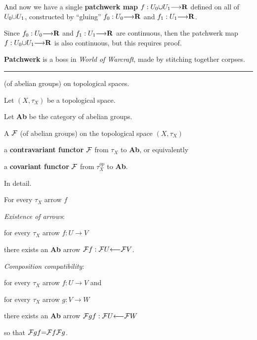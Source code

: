 \vs
And now we have a single {\bf patchwerk map} $f: \g{U_0} \p\cup \b{U_1} \to \R$ defined on all of $\g{U_0} \p\cup \b{U_1}$, constructed by ``gluing'' $\g{f_0}: \g{U_0} \to \R$ and $\b{f_1}: \b{U_1} \to \R$. \par
Since $\g{f_0}: \g{U_0} \to \R$ and $\b{f_1}: \b{U_1} \to \R$ are continuous, then the patchwerk map $f: \g{U_0} \p\cup \b{U_1} \to \R$ is also continuous, but this requires proof. \par
{\bf Patchwerk} is a boss in {\it World of Warcraft}, made by stitching together corpses.

\vs\hrule\vskip1pt
 (of abelian groups) on topological spaces. \par
Let $(X, \tau_X)$ be a topological space. \par
Let {\bf Ab} be the category of abelian groups. \par
A  ${\cal F}$ (of abelian groups) on the topological space $(X, \tau_X)$  \par
  \hs a {\bf contravariant functor} ${\cal F}$ from $\tau_X$ to {\bf Ab}, or equivalently \par
  \hs a {\bf covariant functor} ${\cal F}$ from $\tau_X^{op}$ to {\bf Ab}. \par
In detail. \par

 For every $\tau_X$ arrow $f$ \par
{}

 {\it Existence of arrows}: \par
\hs\hs for every $\tau_X$ arrow $f:U \to V$ \par
\hs\hs\hs there exists an {\bf Ab} arrow ${\cal F}f: {\cal F}U \from {\cal F}V $. \par

 {\it Composition compatibility}: \par
\hs\hs for every $\tau_X$ arrow $f:U \to V$ and \par
\hs\hs for every $\tau_X$ arrow $g:V \to W$ \par
\hs\hs\hs there exists an {\bf Ab} arrow ${\cal F}gf: {\cal F}U \from {\cal F}W$ \par
\hs\hs\hs\hs so that ${\cal F}gf \p= {\cal F}f{\cal F}g$. \par

